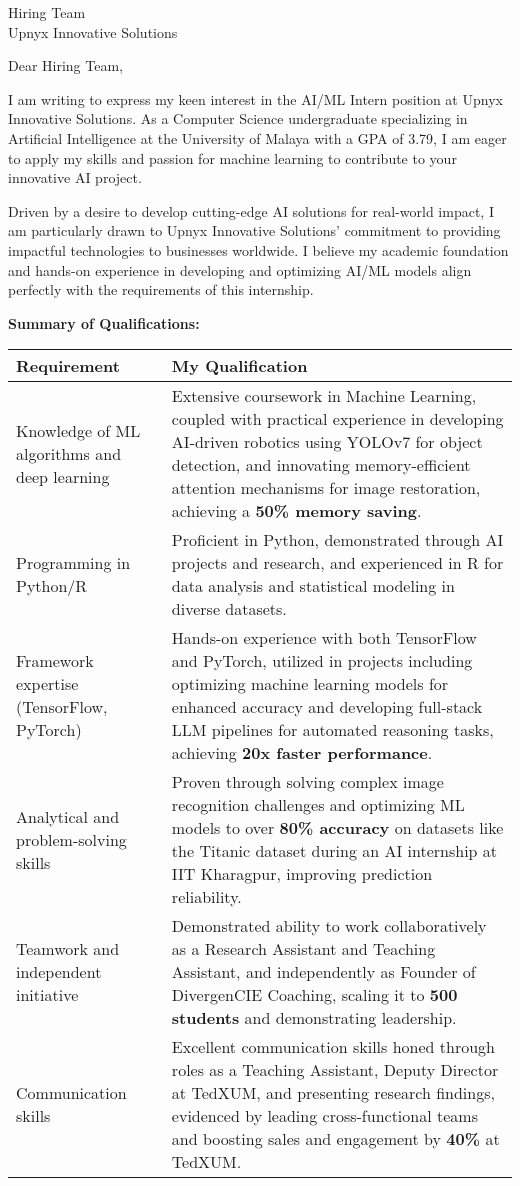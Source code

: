 \documentclass[10pt]{letter}
\date{\today}
\begin{document}
\begin{letter}{Hiring Team\\Upnyx Innovative Solutions}

\opening{Dear Hiring Team,}

I am writing to express my keen interest in the AI/ML Intern position at Upnyx Innovative Solutions. As a Computer Science undergraduate specializing in Artificial Intelligence at the University of Malaya with a GPA of 3.79, I am eager to apply my skills and passion for machine learning to contribute to your innovative AI project.

Driven by a desire to develop cutting-edge AI solutions for real-world impact, I am particularly drawn to Upnyx Innovative Solutions' commitment to providing impactful technologies to businesses worldwide. I believe my academic foundation and hands-on experience in developing and optimizing AI/ML models align perfectly with the requirements of this internship.

\vspace{0.3cm}
\textbf{Summary of Qualifications:}
\vspace{0.2cm}

\renewcommand{\arraystretch}{1.3}
\begin{tabularx}{\textwidth}{@{}p{}X@{}}
\textbf{Requirement} & \textbf{My Qualification} \\
\hline
Knowledge of ML algorithms and deep learning & Extensive coursework in Machine Learning, coupled with practical experience in developing AI-driven robotics using YOLOv7 for object detection, and innovating memory-efficient attention mechanisms for image restoration, achieving a \textbf{50\% memory saving}. \\
Programming in Python/R & Proficient in Python, demonstrated through AI projects and research, and experienced in R for data analysis and statistical modeling in diverse datasets. \\
Framework expertise (TensorFlow, PyTorch) & Hands-on experience with both TensorFlow and PyTorch, utilized in projects including optimizing machine learning models for enhanced accuracy and developing full-stack LLM pipelines for automated reasoning tasks, achieving \textbf{20x faster performance}. \\
Analytical and problem-solving skills & Proven through solving complex image recognition challenges and optimizing ML models to over \textbf{80\% accuracy} on datasets like the Titanic dataset during an AI internship at IIT Kharagpur, improving prediction reliability. \\
Teamwork and independent initiative & Demonstrated ability to work collaboratively as a Research Assistant and Teaching Assistant, and independently as Founder of DivergenCIE Coaching, scaling it to \textbf{500 students} and demonstrating leadership. \\
Communication skills & Excellent communication skills honed through roles as a Teaching Assistant, Deputy Director at TedXUM, and presenting research findings, evidenced by leading cross-functional teams and boosting sales and engagement by \textbf{40\%} at TedXUM. \\
\end{tabularx}


\end{letter}
\end{document}
